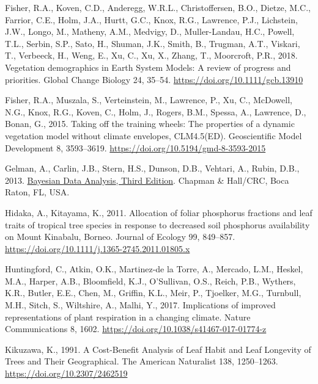 \documentclass[
  12pt,
  letterpaper,
  DIV=11,
  numbers=noendperiod]{scrartcl}
\newlength{\cslhangindent}
\newenvironment{CSLReferences}[2] %
 {\begin{list}{}{%
  \setlength{\itemindent}{0pt}
  \setlength{\leftmargin}{0pt}
  \setlength{\parsep}{0pt}
  \ifodd #1
   \setlength{\leftmargin}{\cslhangindent}
   \setlength{\itemindent}{-1\cslhangindent}
  \fi
  \setlength{\itemsep}{#2\baselineskip}}}
 {\end{list}}
\begin{document}
\begin{CSLReferences}{1}{0}
Fisher, R.A., Koven, C.D., Anderegg, W.R.L., Christoffersen, B.O.,
Dietze, M.C., Farrior, C.E., Holm, J.A., Hurtt, G.C., Knox, R.G.,
Lawrence, P.J., Lichstein, J.W., Longo, M., Matheny, A.M., Medvigy, D.,
Muller-Landau, H.C., Powell, T.L., Serbin, S.P., Sato, H., Shuman, J.K.,
Smith, B., Trugman, A.T., Viskari, T., Verbeeck, H., Weng, E., Xu, C.,
Xu, X., Zhang, T., Moorcroft, P.R., 2018. Vegetation demographics in
{Earth System Models}: {A} review of progress and priorities. Global
Change Biology 24, 35--54. \url{https://doi.org/10.1111/gcb.13910}

Fisher, R.A., Muszala, S., Verteinstein, M., Lawrence, P., Xu, C.,
McDowell, N.G., Knox, R.G., Koven, C., Holm, J., Rogers, B.M., Spessa,
A., Lawrence, D., Bonan, G., 2015. Taking off the training wheels: The
properties of a dynamic vegetation model without climate envelopes,
{CLM4}.5({ED}). Geoscientific Model Development 8, 3593--3619.
\url{https://doi.org/10.5194/gmd-8-3593-2015}

Gelman, A., Carlin, J.B., Stern, H.S., Dunson, D.B., Vehtari, A., Rubin,
D.B., 2013.
\href{https://books.google.com.pa/books?id=eSHSBQAAQBAJ}{Bayesian {Data
Analysis}, {Third Edition}}. Chapman \& Hall/CRC, Boca Raton, FL, USA.

Hidaka, A., Kitayama, K., 2011. Allocation of foliar phosphorus
fractions and leaf traits of tropical tree species in response to
decreased soil phosphorus availability on {Mount Kinabalu}, {Borneo}.
Journal of Ecology 99, 849--857.
\url{https://doi.org/10.1111/j.1365-2745.2011.01805.x}

Huntingford, C., Atkin, O.K., Martinez-de la Torre, A., Mercado, L.M.,
Heskel, M.A., Harper, A.B., Bloomfield, K.J., O'Sullivan, O.S., Reich,
P.B., Wythers, K.R., Butler, E.E., Chen, M., Griffin, K.L., Meir, P.,
Tjoelker, M.G., Turnbull, M.H., Sitch, S., Wiltshire, A., Malhi, Y.,
2017. Implications of improved representations of plant respiration in a
changing climate. Nature Communications 8, 1602.
\url{https://doi.org/10.1038/s41467-017-01774-z}

Kikuzawa, K., 1991. A {Cost-Benefit Analysis} of {Leaf Habit} and {Leaf
Longevity} of {Trees} and {Their Geographical}. The American Naturalist
138, 1250--1263. \url{https://doi.org/10.2307/2462519}


\end{CSLReferences}
\end{document}
